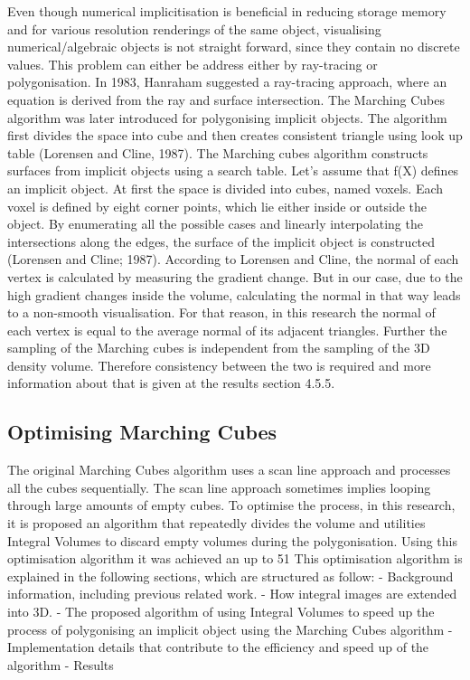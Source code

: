 \documentclass{subfiles}
\begin{document}
Even though numerical implicitisation is beneficial in reducing storage memory and for various resolution renderings of the same object, visualising numerical/algebraic objects is not straight forward, since they contain no discrete values. This problem can either be address either by ray-tracing or polygonisation. In 1983, Hanraham suggested a ray-tracing approach, where an equation is derived from the ray and surface intersection.  The Marching Cubes algorithm was later introduced for polygonising implicit objects. The algorithm first divides the space into cube and then creates consistent triangle using look up table (Lorensen and Cline, 1987). \newline\newline
The Marching cubes algorithm constructs surfaces from implicit objects using a search table. Let’s assume that f(X) defines an implicit object. At first the space is divided into cubes, named voxels. Each voxel is defined by eight corner points, which lie either inside or outside the object. By enumerating all the possible cases and linearly interpolating the intersections along the edges, the surface of the implicit object is constructed (Lorensen and Cline; 1987).\newline\newline
According to Lorensen and Cline, the normal of each vertex is calculated by measuring the gradient change. But in our case, due to the high gradient changes inside the volume, calculating the normal in that way leads to a non-smooth visualisation. For that reason, in this research the normal of each vertex is equal to the average normal of its adjacent triangles. \newline\newline
Further the sampling of the Marching cubes is independent from the sampling of the 3D density volume. Therefore consistency between the two is required and more information about that is given at the results section 4.5.5. 
\subsection{Optimising Marching Cubes}
The original Marching Cubes algorithm uses a scan line approach and processes all the cubes sequentially. The scan line approach sometimes implies looping through large amounts of empty cubes. To optimise the process, in this research, it is proposed an algorithm that repeatedly divides the volume and utilities Integral Volumes to discard empty volumes during the polygonisation. Using this optimisation algorithm it was achieved an up to 51%
This optimisation algorithm is explained in the following sections, which are structured as follow:
-	Background information, including previous related work. 
-	How integral images are extended into 3D. 
-	The proposed algorithm of using Integral Volumes to speed up the process of polygonising an implicit object using the Marching Cubes algorithm
-	Implementation details that contribute to the efficiency and speed up of the algorithm
-	Results
\end{document}
